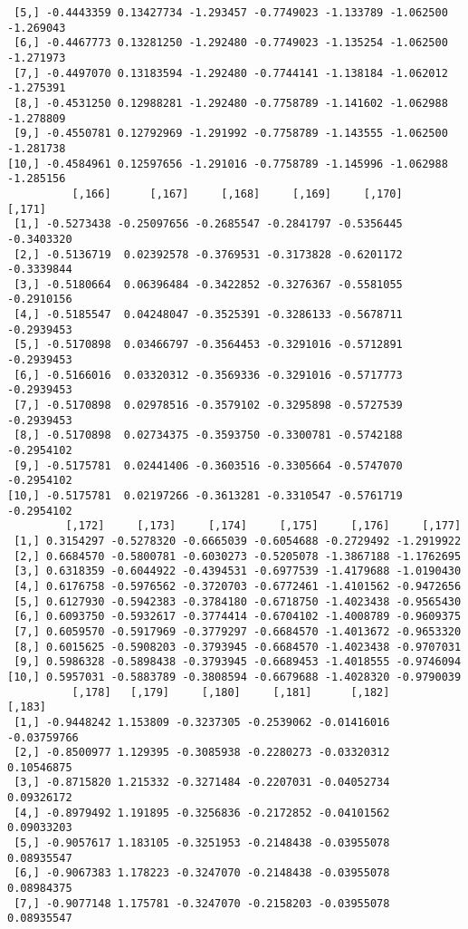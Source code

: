 \documentclass[
  letterpaper,
  DIV=11,
  numbers=noendperiod]{scrreprt}
\begin{document}
\begin{verbatim}
 [5,] -0.4443359 0.13427734 -1.293457 -0.7749023 -1.133789 -1.062500 -1.269043
 [6,] -0.4467773 0.13281250 -1.292480 -0.7749023 -1.135254 -1.062500 -1.271973
 [7,] -0.4497070 0.13183594 -1.292480 -0.7744141 -1.138184 -1.062012 -1.275391
 [8,] -0.4531250 0.12988281 -1.292480 -0.7758789 -1.141602 -1.062988 -1.278809
 [9,] -0.4550781 0.12792969 -1.291992 -0.7758789 -1.143555 -1.062500 -1.281738
[10,] -0.4584961 0.12597656 -1.291016 -0.7758789 -1.145996 -1.062988 -1.285156
          [,166]      [,167]     [,168]     [,169]     [,170]     [,171]
 [1,] -0.5273438 -0.25097656 -0.2685547 -0.2841797 -0.5356445 -0.3403320
 [2,] -0.5136719  0.02392578 -0.3769531 -0.3173828 -0.6201172 -0.3339844
 [3,] -0.5180664  0.06396484 -0.3422852 -0.3276367 -0.5581055 -0.2910156
 [4,] -0.5185547  0.04248047 -0.3525391 -0.3286133 -0.5678711 -0.2939453
 [5,] -0.5170898  0.03466797 -0.3564453 -0.3291016 -0.5712891 -0.2939453
 [6,] -0.5166016  0.03320312 -0.3569336 -0.3291016 -0.5717773 -0.2939453
 [7,] -0.5170898  0.02978516 -0.3579102 -0.3295898 -0.5727539 -0.2939453
 [8,] -0.5170898  0.02734375 -0.3593750 -0.3300781 -0.5742188 -0.2954102
 [9,] -0.5175781  0.02441406 -0.3603516 -0.3305664 -0.5747070 -0.2954102
[10,] -0.5175781  0.02197266 -0.3613281 -0.3310547 -0.5761719 -0.2954102
         [,172]     [,173]     [,174]     [,175]     [,176]     [,177]
 [1,] 0.3154297 -0.5278320 -0.6665039 -0.6054688 -0.2729492 -1.2919922
 [2,] 0.6684570 -0.5800781 -0.6030273 -0.5205078 -1.3867188 -1.1762695
 [3,] 0.6318359 -0.6044922 -0.4394531 -0.6977539 -1.4179688 -1.0190430
 [4,] 0.6176758 -0.5976562 -0.3720703 -0.6772461 -1.4101562 -0.9472656
 [5,] 0.6127930 -0.5942383 -0.3784180 -0.6718750 -1.4023438 -0.9565430
 [6,] 0.6093750 -0.5932617 -0.3774414 -0.6704102 -1.4008789 -0.9609375
 [7,] 0.6059570 -0.5917969 -0.3779297 -0.6684570 -1.4013672 -0.9653320
 [8,] 0.6015625 -0.5908203 -0.3793945 -0.6684570 -1.4023438 -0.9707031
 [9,] 0.5986328 -0.5898438 -0.3793945 -0.6689453 -1.4018555 -0.9746094
[10,] 0.5957031 -0.5883789 -0.3808594 -0.6679688 -1.4028320 -0.9790039
          [,178]   [,179]     [,180]     [,181]      [,182]      [,183]
 [1,] -0.9448242 1.153809 -0.3237305 -0.2539062 -0.01416016 -0.03759766
 [2,] -0.8500977 1.129395 -0.3085938 -0.2280273 -0.03320312  0.10546875
 [3,] -0.8715820 1.215332 -0.3271484 -0.2207031 -0.04052734  0.09326172
 [4,] -0.8979492 1.191895 -0.3256836 -0.2172852 -0.04101562  0.09033203
 [5,] -0.9057617 1.183105 -0.3251953 -0.2148438 -0.03955078  0.08935547
 [6,] -0.9067383 1.178223 -0.3247070 -0.2148438 -0.03955078  0.08984375
 [7,] -0.9077148 1.175781 -0.3247070 -0.2158203 -0.03955078  0.08935547

\end{verbatim}
\end{document}
